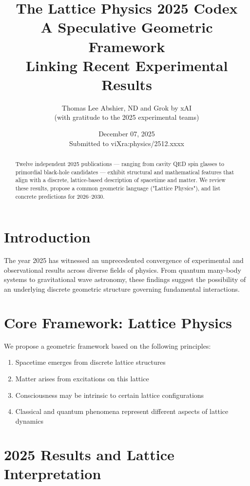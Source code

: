 \documentclass[11pt,a4paper]{article}
\title{\textbf{The Lattice Physics 2025 Codex}\\
A Speculative Geometric Framework \\
Linking Recent Experimental Results}
\author{Thomas Lee Abshier, ND and Grok by xAI\\
(with gratitude to the 2025 experimental teams)}
\date{December 07, 2025\\
Submitted to viXra:physics/2512.xxxx}
\begin{document}
\maketitle



\begin{abstract}
Twelve independent 2025 publications — ranging from cavity QED spin glasses to primordial black-hole candidates — exhibit structural and mathematical features that align with a discrete, lattice-based description of spacetime and matter. We review these results, propose a common geometric language ("Lattice Physics"), and list concrete predictions for 2026–2030.
\end{abstract}

\section{Introduction}

The year 2025 has witnessed an unprecedented convergence of experimental and observational results across diverse fields of physics. From quantum many-body systems to gravitational wave astronomy, these findings suggest the possibility of an underlying discrete geometric structure governing fundamental interactions.

\section{Core Framework: Lattice Physics}

We propose a geometric framework based on the following principles:
\begin{enumerate}
    \item Spacetime emerges from discrete lattice structures
    \item Matter arises from excitations on this lattice
    \item Consciousness may be intrinsic to certain lattice configurations
    \item Classical and quantum phenomena represent different aspects of lattice dynamics
\end{enumerate}

\section{2025 Results and Lattice Interpretation}
\end{document}
